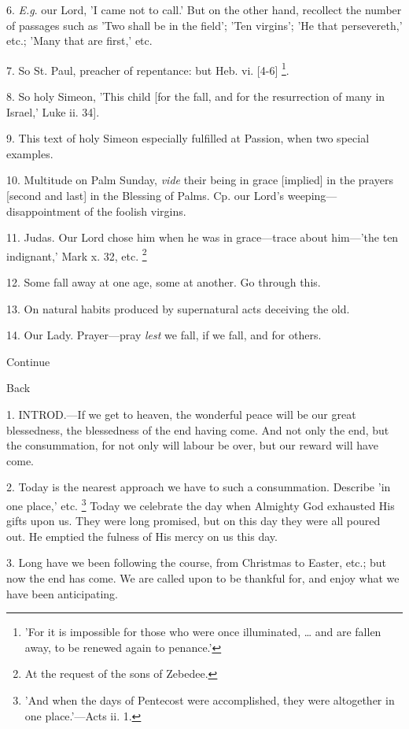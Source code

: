 6. \emph{E.g}. our Lord, 'I came not to call.'
But on the other hand, recollect the number of passages such as 'Two
shall be in the field'; 'Ten virgins'; 'He that persevereth,' etc.;
'Many that are first,' etc.

7. So St. Paul, preacher of repentance: but Heb.
vi. [4-6] \footnote{'For it is impossible
for those who were once illuminated, … and are fallen away, to be
renewed again to penance.'}.

8. So holy Simeon, 'This child [for the fall,
and for the resurrection of many in Israel,' Luke ii. 34].

9. This text of holy Simeon especially fulfilled
at Passion, when two special examples.

10. Multitude on Palm Sunday, \emph{vide} their
being in grace [implied] in the prayers [second and last] in the
Blessing of Palms. Cp. our Lord's weeping—disappointment of the
foolish virgins.

11. Judas. Our Lord chose him when he was in
grace—trace about him—'the ten indignant,' Mark x. 32, etc. \footnote{At the request of the
sons of Zebedee.}

12. Some fall away at one age, some at another.
Go through this.

13. On natural habits produced by supernatural
acts deceiving the old.

14. Our Lady. Prayer—pray \emph{lest} we fall,
if we fall, and for others.

Continue

Back


1. INTROD.—If
we get to heaven, the wonderful peace will be our great blessedness,
the blessedness of the end having come. And not only the end, but the
consummation, for not only will labour be over, but our reward will
have come.

2. Today is the nearest approach we have to such
a consummation. Describe 'in one place,' etc. \footnote{'And when the days of Pentecost were
accomplished, they were altogether in one place.'—Acts ii. 1.} Today we celebrate the day when Almighty God exhausted His
gifts upon us. They were long promised, but on this day they
were all poured out. He emptied the fulness of His mercy on us this
day.

3. Long have we been following the course, from
Christmas to Easter, etc.; but now the end has come. We are called
upon to be thankful for, and enjoy what we have been anticipating.

